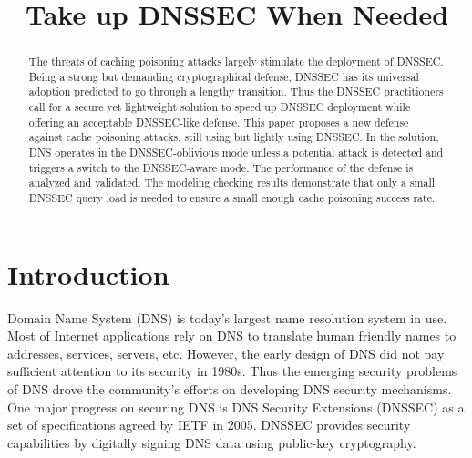 \documentclass[conference]{IEEEtran}
\begin{document}
\title{Take up DNSSEC When Needed}



\author{
}





\maketitle

\begin{abstract}
The threats of caching poisoning attacks largely stimulate the deployment of DNSSEC. Being a strong but demanding cryptographical defense, DNSSEC has its universal adoption predicted to go through a lengthy transition. Thus the DNSSEC practitioners call for a secure yet lightweight solution to speed up DNSSEC deployment while offering an acceptable DNSSEC-like defense. This paper proposes a new defense against cache poisoning attacks, still using but lightly using DNSSEC. In the solution, DNS operates in the DNSSEC-oblivious mode unless a potential attack is detected and triggers a switch to the DNSSEC-aware mode. The performance of the defense is analyzed and validated. The modeling checking results demonstrate that only a small DNSSEC query load is needed to ensure a small enough cache poisoning success rate.
\end{abstract}



\section{Introduction}

Domain Name System (DNS) is today's largest name resolution system in use. Most of Internet applications rely on DNS to translate human friendly names to addresses, services, servers, etc. However, the early design of DNS did not pay sufficient attention to its security in 1980s. Thus the emerging security problems of DNS drove the community's efforts on developing DNS security mechanisms. One major progress on securing DNS is DNS Security Extensions (DNSSEC)
\cite{DNSSEC} as a set of specifications agreed by IETF in 2005. DNSSEC provides security capabilities by digitally signing 
DNS data using public-key cryptography.
\end{document}
